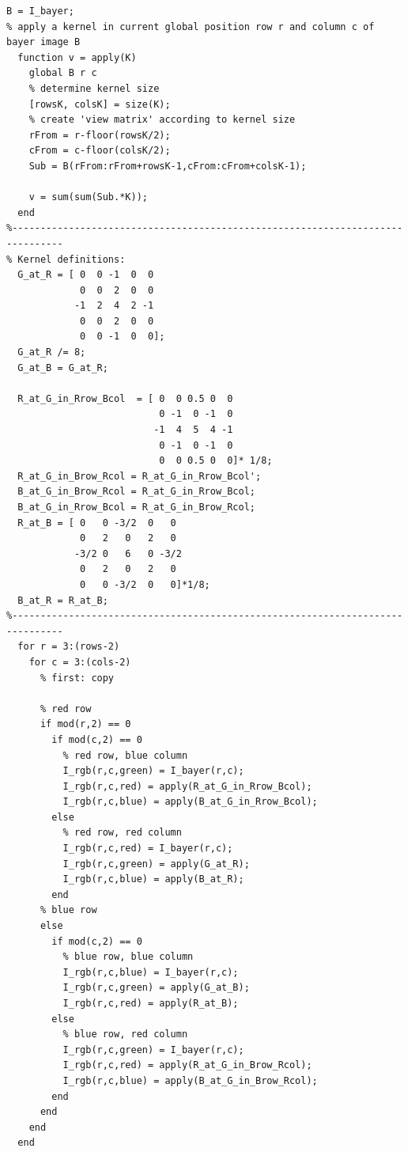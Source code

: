 \begin{lstlisting}[caption=R\"ucktransformation von Bayer nach RGB]
  B = I_bayer;
% apply a kernel in current global position row r and column c of bayer image B
  function v = apply(K)
    global B r c
    % determine kernel size
    [rowsK, colsK] = size(K);
    % create 'view matrix' according to kernel size
    rFrom = r-floor(rowsK/2);
    cFrom = c-floor(colsK/2);
    Sub = B(rFrom:rFrom+rowsK-1,cFrom:cFrom+colsK-1);

    v = sum(sum(Sub.*K));
  end
%-------------------------------------------------------------------------------
% Kernel definitions:
  G_at_R = [ 0  0 -1  0  0
             0  0  2  0  0
            -1  2  4  2 -1
             0  0  2  0  0
             0  0 -1  0  0];
  G_at_R /= 8;
  G_at_B = G_at_R;
  
  R_at_G_in_Rrow_Bcol  = [ 0  0 0.5 0  0
                           0 -1  0 -1  0
                          -1  4  5  4 -1
                           0 -1  0 -1  0
                           0  0 0.5 0  0]* 1/8;
  R_at_G_in_Brow_Rcol = R_at_G_in_Rrow_Bcol';
  B_at_G_in_Brow_Rcol = R_at_G_in_Rrow_Bcol;
  B_at_G_in_Rrow_Bcol = R_at_G_in_Brow_Rcol;
  R_at_B = [ 0   0 -3/2  0   0
             0   2   0   2   0
            -3/2 0   6   0 -3/2
             0   2   0   2   0
             0   0 -3/2  0   0]*1/8;
  B_at_R = R_at_B;
%-------------------------------------------------------------------------------
  for r = 3:(rows-2)
    for c = 3:(cols-2)
      % first: copy 
      
      % red row
      if mod(r,2) == 0
        if mod(c,2) == 0
          % red row, blue column
          I_rgb(r,c,green) = I_bayer(r,c);
          I_rgb(r,c,red) = apply(R_at_G_in_Rrow_Bcol);
          I_rgb(r,c,blue) = apply(B_at_G_in_Rrow_Bcol);
        else
          % red row, red column
          I_rgb(r,c,red) = I_bayer(r,c);
          I_rgb(r,c,green) = apply(G_at_R);
          I_rgb(r,c,blue) = apply(B_at_R);
        end
      % blue row
      else 
        if mod(c,2) == 0
          % blue row, blue column
          I_rgb(r,c,blue) = I_bayer(r,c);
          I_rgb(r,c,green) = apply(G_at_B);
          I_rgb(r,c,red) = apply(R_at_B);
        else
          % blue row, red column
          I_rgb(r,c,green) = I_bayer(r,c);
          I_rgb(r,c,red) = apply(R_at_G_in_Brow_Rcol);
          I_rgb(r,c,blue) = apply(B_at_G_in_Brow_Rcol);
        end
      end
    end
  end
\end{lstlisting}


